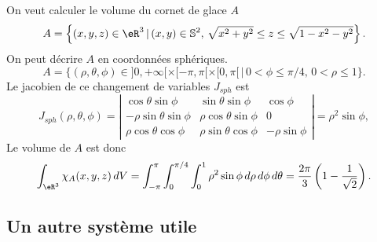 \begin{example}
	On veut calculer le volume du cornet de glace  \( A\)
	\[
		A=\left\{(x,y,z)\in\eR^3\, \vert \, (x,y)\in \mathbb{S}^2, \,\sqrt{x^2+y^2}\leq z\leq \sqrt{1-x^2-y^2} \right\}.
	\]
	On peut décrire \( A\) en coordonnées sphériques.
	\[
		A=\{(\rho,\theta,\phi) \in ]0, +\infty[\times [-\pi,\pi[\times [0,\pi[\,\vert\, 0<\phi\leq\pi/4, \, 0<\rho\leq 1 \}.
	\]
	Le jacobien de ce changement de variables  \( J_{sph}\) est
	\begin{equation}
		J_{sph}(\rho, \theta, \phi)= \left\vert\begin{array}{ccc}
			\cos \theta \sin\phi     & \sin \theta\sin\phi     & \cos\phi      \\
			-\rho\sin \theta\sin\phi & \rho\cos \theta\sin\phi & 0             \\
			\rho\cos\theta\cos\phi   & \rho\sin\theta\cos\phi  & -\rho\sin\phi
		\end{array}\right\vert= \rho^2\sin\phi,
	\end{equation}
	Le volume de \( A\) est donc
	\[
		\int_{\eR^3}\chi_{A}(x,y,z)\, dV=\int_{-\pi}^{\pi}\int_0^{\pi/4}\int_{0}^{1}\rho^2\sin\phi \,d\rho\,d\phi\,d\theta=\frac{2\pi}{3}\left(1-\frac{1}{\sqrt{2}}\right).
	\]
\end{example}

\subsection{Un autre système utile}

